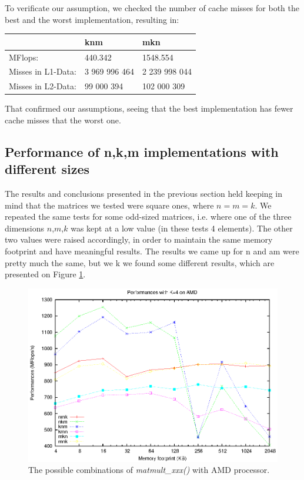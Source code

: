 To verificate our assumption, we checked the number of cache misses for both the best and the worst implementation, resulting in:

\vspace{10pt} 
\begin{tabular}{ l l l}
\hline
 & knm& mkn\\ \hline
MFlops:        &  440.342& 1548.554 \\ \hline
Misses in L1-Data:     & 3 969 996 464 & 2 239 998 044 \\ \hline
Misses in L2-Data:     & 99 000 394 & 102 000 309\\ \hline

\end{tabular}

\vspace{10pt} 

That confirmed our assumptions, seeing that the best implementation has fewer cache misses that the worst one.

\subsection{Performance of n,k,m implementations with different sizes}
The results and conclusions presented in the previous section held keeping in mind that the matrices we tested were square ones, where $n=m=k$. We repeated the same tests for some odd-sized matrices, i.e. where one of the three dimensions $n$,$m$,$k$ was kept at a low value (in these tests 4 elements). The other two values were raised accordingly, in order to maintain the same memory footprint and have meaningful results. The results we came up for n and am were pretty much the same, but we k we found some different results, which are presented on Figure \ref{fig:lowk}.

\begin{figure}[here]
\centering
\includegraphics[width=\textwidth]{results/littlek.eps}
\caption{The possible combinations of \emph{matmult\_xxx()} with AMD processor.}
\label{fig:lowk}
\end{figure}

